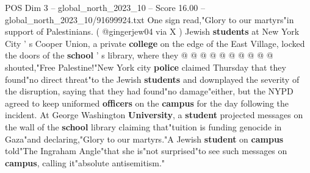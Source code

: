 \begin{textsample}{POS Dim 3 – global\_north\_2023\_10 – Score 16.00 – global\_north\_2023\_10/91699924.txt}
One sign read,"Glory to our martyrs"in support of Palestinians. ( @gingerjew04 via X ) Jewish \textbf{students} at New York City ' s Cooper Union, a private \textbf{college} on the edge of the East Village, locked the doors of the \textbf{school} ' s library, where they @ @ @ @ @ @ @ @ @ @ shouted,"Free Palestine!"New York city \textbf{police} claimed Thursday that they found"no direct threat"to the Jewish \textbf{students} and downplayed the severity of the disruption, saying that they had found"no damage"either, but the NYPD agreed to keep uniformed \textbf{officers} on the \textbf{campus} for the day following the incident.
At George Washington \textbf{University}, a \textbf{student} projected messages on the wall of the \textbf{school} library claiming that"tuition is funding genocide in Gaza"and declaring,"Glory to our martyrs."A Jewish \textbf{student} on \textbf{campus} told"The Ingraham Angle"that she is"not surprised"to see such messages on \textbf{campus}, calling it"absolute antisemitism."

\end{textsample}
